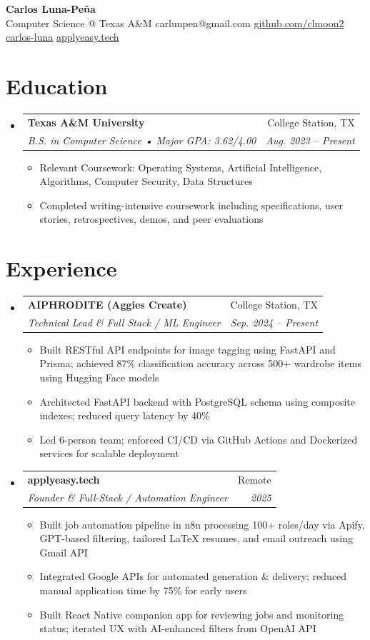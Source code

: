 \documentclass[letterpaper,11pt]{article}
\makeatletter
\newcommand{\resumeItem}[1]{
  \item\small{{#1 \vspace{-2pt}}}
}
\newcommand{\resumeSubheading}[4]{
  \vspace{-2pt}\item
    \begin{tabular*}{0.97\textwidth}[t]{l@{\extracolsep{\fill}}r}
      \textbf{#1} & #2 \\
      \textit{\small#3} & \textit{\small #4} \\
    \end{tabular*}\vspace{-7pt}
}
\newcommand{\resumeSubHeadingListStart}{\begin{itemize}[leftmargin=0.15in, label={}]}
\newcommand{\resumeSubHeadingListEnd}{\end{itemize}}
\newcommand{\resumeItemListStart}{\begin{itemize}}
\newcommand{\resumeItemListEnd}{\end{itemize}\vspace{-5pt}}
\makeatother
\begin{document}
\begin{center}
  \textbf{\Huge Carlos Luna-Pe\~na} \\
  \small{Computer Science @ Texas A\&M \textbar{} carlunpen@gmail.com \textbar{} \href{https://github.com/clmoon2}{github.com/clmoon2} \textbar{} \href{https://linkedin.com/in/carlos-luna}{carlos-luna} \textbar{} \href{https://applyeasy.tech}{applyeasy.tech}}
\end{center}

\section{Education}
\resumeSubHeadingListStart
  \resumeSubheading
    {Texas A\&M University}{College Station, TX}
    {B.S. in Computer Science \textnormal{•} Major GPA: 3.62/4.00}{Aug. 2023 -- Present}
    \resumeItemListStart
      \resumeItem{Relevant Coursework: Operating Systems, Artificial Intelligence, Algorithms, Computer Security, Data Structures}
      \resumeItem{Completed writing-intensive coursework including specifications, user stories, retrospectives, demos, and peer evaluations}
    \resumeItemListEnd
\resumeSubHeadingListEnd

\section{Experience}
\resumeSubHeadingListStart
  \resumeSubheading
    {AIPHRODITE (Aggies Create)}{College Station, TX}
    {Technical Lead \& Full Stack / ML Engineer}{Sep. 2024 -- Present}
    \resumeItemListStart
      \resumeItem{Built RESTful API endpoints for image tagging using FastAPI and Prisma; achieved 87\% classification accuracy across 500+ wardrobe items using Hugging Face models}
      \resumeItem{Architected FastAPI backend with PostgreSQL schema using composite indexes; reduced query latency by 40\%}
      \resumeItem{Led 6-person team; enforced CI/CD via GitHub Actions and Dockerized services for scalable deployment}
    \resumeItemListEnd

  \resumeSubheading
    {applyeasy.tech}{Remote}
    {Founder \& Full-Stack / Automation Engineer}{2025}
    \resumeItemListStart
      \resumeItem{Built job automation pipeline in n8n processing 100+ roles/day via Apify, GPT-based filtering, tailored LaTeX resumes, and email outreach using Gmail API}
      \resumeItem{Integrated Google APIs for automated generation \& delivery; reduced manual application time by 75\% for early users}
      \resumeItem{Built React Native companion app for reviewing jobs and monitoring status; iterated UX with AI-enhanced filters from OpenAI API}
    \resumeItemListEnd
\resumeSubHeadingListEnd
\end{document}
